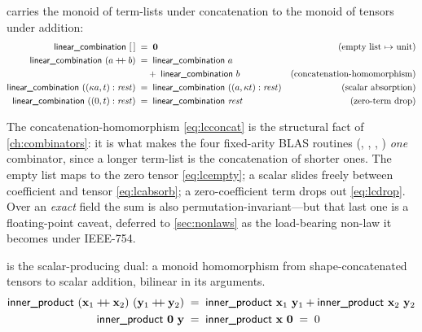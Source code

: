 \begin{theorem}
\label{thm:lincomb}
 carries the monoid of term-lists under concatenation to
the monoid of tensors under addition:
\begin{align}
  \textsf{linear\_combination}\ [\,] &\;=\; \mathbf{0}
    & \text{(empty list $\mapsto$ unit)} \label{eq:lcempty}\\
  \textsf{linear\_combination}\ (a \mathbin{+\!\!+} b)
    &\;=\; \textsf{linear\_combination}\ a \notag\\
    &\quad\;+\; \textsf{linear\_combination}\ b
    & \text{(concatenation-homomorphism)} \label{eq:lcconcat}\\
  \textsf{linear\_combination}\ ((\kappa a, t):\mathit{rest})
    &\;=\; \textsf{linear\_combination}\ ((a, \kappa t):\mathit{rest})
    & \text{(scalar absorption)} \label{eq:lcabsorb}\\
  \textsf{linear\_combination}\ ((0, t):\mathit{rest})
    &\;=\; \textsf{linear\_combination}\ \mathit{rest}
    & \text{(zero-term drop)} \label{eq:lcdrop}
\end{align}
\end{theorem}

\noindent The concatenation-homomorphism \eqref{eq:lcconcat} is the structural fact
of \cref{ch:combinators}: it is what makes the four fixed-arity BLAS routines
(, , , ) \emph{one} combinator,
since a longer term-list is the concatenation of shorter ones. The empty list maps to
the zero tensor \eqref{eq:lcempty}; a scalar slides freely between coefficient and
tensor \eqref{eq:lcabsorb}; a zero-coefficient term drops out \eqref{eq:lcdrop}. Over
an \emph{exact} field the sum is also permutation-invariant---but that last one is a
floating-point caveat, deferred to \cref{sec:nonlaws} as the load-bearing non-law it
becomes under IEEE-754.

\begin{theorem}
\label{thm:ip}
 is the scalar-producing dual: a monoid homomorphism from
shape-concatenated tensors to scalar addition, bilinear in its arguments.
\begin{align}
  \textsf{inner\_product}\ (\mathbf{x}_1 \mathbin{+\!\!+} \mathbf{x}_2)\ (\mathbf{y}_1 \mathbin{+\!\!+} \mathbf{y}_2)
    &\;=\; \textsf{inner\_product}\ \mathbf{x}_1\ \mathbf{y}_1 + \textsf{inner\_product}\ \mathbf{x}_2\ \mathbf{y}_2
    \label{eq:ipsplit}\\
  \textsf{inner\_product}\ \mathbf{0}\ \mathbf{y}
    &\;=\; \textsf{inner\_product}\ \mathbf{x}\ \mathbf{0} \;=\; 0
    \label{eq:ipzero}
\end{align}
\end{theorem}

